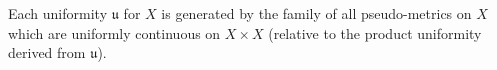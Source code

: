 Each uniformity $\mathfrak{u}$ for $X$ is generated by the family of all pseudo-metrics on $X$ which are uniformly continuous on $X \times X$ (relative to the product uniformity derived from $\mathfrak{u}$).
